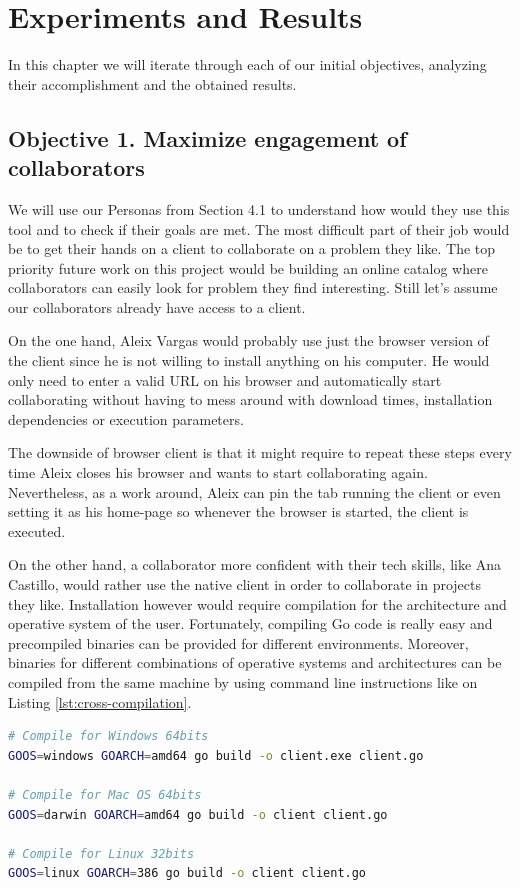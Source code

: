 \chapter{Experiments and Results}

In this chapter we will iterate through each of our initial objectives, analyzing their accomplishment and the obtained results.

\section{Objective 1. Maximize engagement of collaborators}

We will use our Personas from Section 4.1 to understand how would they use this tool and to check if their goals are met. The most difficult part of their job would be to get their hands on a client to collaborate on a problem they like. The top priority future work on this project would be building an online catalog where collaborators can easily look for problem they find interesting. Still let's assume our collaborators already have access to a client.

On the one hand, Aleix Vargas would probably use just the browser version of the client since he is not willing to install anything on his computer. He would only need to enter a valid URL on his browser and automatically start collaborating without having to mess around with download times, installation dependencies or execution parameters. 

The downside of browser client is that it might require to repeat these steps every time Aleix closes his browser and wants to start collaborating again. Nevertheless, as a work around, Aleix can pin the tab running the client or even setting it as his home-page so whenever the browser is started, the client is executed.

On the other hand, a collaborator more confident with their tech skills, like Ana Castillo, would rather use the native client in order to collaborate in projects they like. Installation however would require compilation for the architecture and operative system of the user. Fortunately, compiling Go code is really easy and precompiled binaries can be provided for different environments. Moreover, binaries for different combinations of operative systems and architectures can be compiled from the same machine by using command line instructions like on Listing \ref{lst:cross-compilation}.

\begin{lstlisting}[language=bash,
caption={Cross-compilation of client for different operative systems and architectures from the same Linux machine.},
label={lst:cross-compilation},
captionpos=b]
# Compile for Windows 64bits
GOOS=windows GOARCH=amd64 go build -o client.exe client.go

# Compile for Mac OS 64bits
GOOS=darwin GOARCH=amd64 go build -o client client.go

# Compile for Linux 32bits
GOOS=linux GOARCH=386 go build -o client client.go
\end{lstlisting} 


